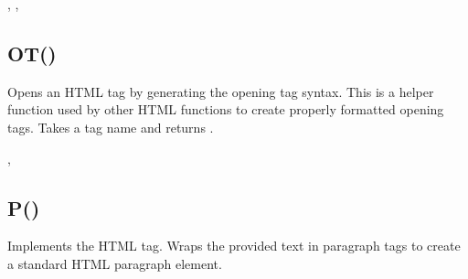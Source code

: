 \documentclass[letterpaper,10pt,english]{sphinxmanual}
\begin{document}
\sphinxAtStartPar
{}

\sphinxAtStartPar
{}, , 

\ignorespaces 

\subsection{OT()}
\label{\detokenize{reference/html:ot}}\label{\detokenize{reference/html:index-8}}
\sphinxAtStartPar
{}

\sphinxAtStartPar
Opens an HTML tag by generating the opening tag syntax. This is a helper function used by other HTML functions to create properly formatted opening tags. Takes a tag name and returns .

\sphinxAtStartPar
{}

\begin{sphinxVerbatim}[commandchars=\\\{\}]
\end{sphinxVerbatim}

\sphinxAtStartPar
{}

\begin{sphinxVerbatim}[commandchars=\\\{\}]
\end{sphinxVerbatim}

\sphinxAtStartPar
{}

\sphinxAtStartPar
{}, 

\ignorespaces 

\subsection{P()}
\label{\detokenize{reference/html:p}}\label{\detokenize{reference/html:index-9}}
\sphinxAtStartPar
{}

\sphinxAtStartPar
Implements the HTML  tag. Wraps the provided text in paragraph tags to create a standard HTML paragraph element.
\end{document}
